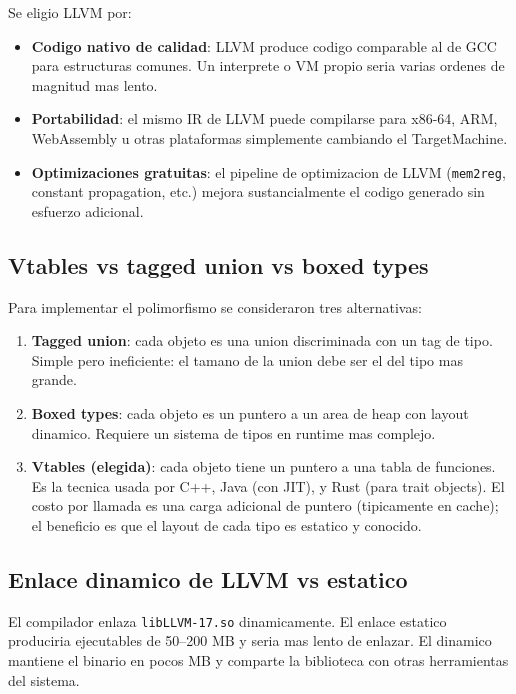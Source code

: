 \documentclass[12pt,a4paper]{article}
\begin{document}
Se eligio LLVM por:

\begin{itemize}
  \item \textbf{Codigo nativo de calidad}: LLVM produce codigo comparable al de GCC
    para estructuras comunes. Un interprete o VM propio seria varias ordenes de magnitud
    mas lento.
  \item \textbf{Portabilidad}: el mismo IR de LLVM puede compilarse para x86-64,
    ARM, WebAssembly u otras plataformas simplemente cambiando el TargetMachine.
  \item \textbf{Optimizaciones gratuitas}: el pipeline de optimizacion de LLVM
    (\texttt{mem2reg}, constant propagation, etc.) mejora sustancialmente el codigo
    generado sin esfuerzo adicional.
\end{itemize}

\subsection{Vtables vs tagged union vs boxed types}

Para implementar el polimorfismo se consideraron tres alternativas:

\begin{enumerate}
  \item \textbf{Tagged union}: cada objeto es una union discriminada con un tag de tipo.
    Simple pero ineficiente: el tamano de la union debe ser el del tipo mas grande.
  \item \textbf{Boxed types}: cada objeto es un puntero a un area de heap con layout
    dinamico. Requiere un sistema de tipos en runtime mas complejo.
  \item \textbf{Vtables (elegida)}: cada objeto tiene un puntero a una tabla de
    funciones. Es la tecnica usada por C++, Java (con JIT), y Rust (para trait objects).
    El costo por llamada es una carga adicional de puntero (tipicamente en cache);
    el beneficio es que el layout de cada tipo es estatico y conocido.
\end{enumerate}

\subsection{Enlace dinamico de LLVM vs estatico}

El compilador enlaza \texttt{libLLVM-17.so} dinamicamente. El enlace estatico produciria
ejecutables de 50--200 MB y seria mas lento de enlazar. El dinamico mantiene el
binario en pocos MB y comparte la biblioteca con otras herramientas del sistema.
\end{document}
